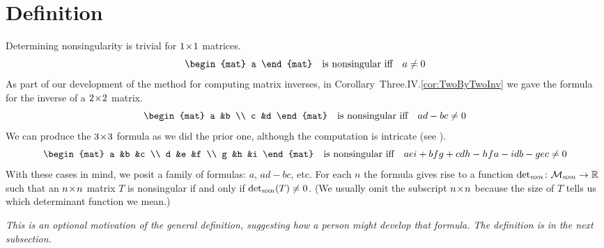 \section{Def{}inition}
Determining nonsingularity
is trivial for \( 1 \! \times \! 1 \) matrices.
\begin{equation*}
  \begin{mat}
       a
  \end{mat} 
  \quad\text{is nonsingular iff}\quad
  a \neq 0
\end{equation*}
As part of our development of the method for  
computing matrix inverses, in 
Corollary~Three.IV.\ref{cor:TwoByTwoInv} we gave the formula for 
the inverse of a $2 \! \times \! 2$ matrix. 
\begin{equation*}
     \begin{mat}
           a  &b  \\
           c  &d
      \end{mat}  
   \quad\text{is nonsingular iff}\quad
   ad-bc \neq 0
\end{equation*}
We can produce the $3 \! \times \! 3$ formula as we did the prior one,  
although the computation is intricate
(see ).
\begin{equation*}
     \begin{mat}
           a  &b  &c  \\
           d  &e  &f  \\
           g  &h  &i
     \end{mat}
  \quad\text{is nonsingular iff}\quad
    aei+bfg+cdh-hfa-idb-gec \neq 0
\end{equation*}
With these cases in mind, we posit a family of 
formulas: $a$, $ad-bc$, etc. 
For each $n$ the formula gives rise to a 
function
$\mbox{$\det_{n \! \times \! n}\colon \mathcal{M}_{n \! \times \! n}\to \mathbb{R}$}$ 
such that an $n \! \times \! n$ matrix $T$ is nonsingular if and
only if $\det_{n \! \times \! n}(T)\neq 0$.
(We usually omit the subscript \( n \! \times \! n \) because 
the size of \( T \) tells us which determinant function we mean.)






\textit{This is an optional
motivation of the general definition, suggesting how a person might
develop that formula.
The definition is in the next 
subsection.}

